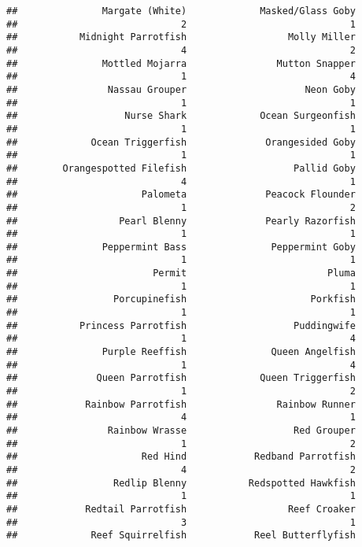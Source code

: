 \documentclass[
]{article}
\begin{document}
\begin{verbatim}
##               Margate (White)             Masked/Glass Goby 
##                             2                             1 
##           Midnight Parrotfish                  Molly Miller 
##                             4                             2 
##               Mottled Mojarra                Mutton Snapper 
##                             1                             4 
##                Nassau Grouper                     Neon Goby 
##                             1                             1 
##                   Nurse Shark             Ocean Surgeonfish 
##                             1                             1 
##             Ocean Triggerfish              Orangesided Goby 
##                             1                             1 
##        Orangespotted Filefish                   Pallid Goby 
##                             4                             1 
##                      Palometa              Peacock Flounder 
##                             1                             2 
##                  Pearl Blenny              Pearly Razorfish 
##                             1                             1 
##               Peppermint Bass               Peppermint Goby 
##                             1                             1 
##                        Permit                         Pluma 
##                             1                             1 
##                 Porcupinefish                      Porkfish 
##                             1                             1 
##           Princess Parrotfish                   Puddingwife 
##                             1                             4 
##               Purple Reeffish               Queen Angelfish 
##                             1                             4 
##              Queen Parrotfish             Queen Triggerfish 
##                             1                             2 
##            Rainbow Parrotfish                Rainbow Runner 
##                             4                             1 
##                Rainbow Wrasse                   Red Grouper 
##                             1                             2 
##                      Red Hind            Redband Parrotfish 
##                             4                             2 
##                 Redlip Blenny           Redspotted Hawkfish 
##                             1                             1 
##            Redtail Parrotfish                  Reef Croaker 
##                             3                             1 
##             Reef Squirrelfish            Reel Butterflyfish 

\end{verbatim}
\end{document}
